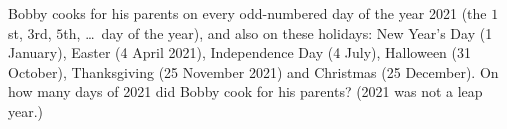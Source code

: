 Bobby cooks for his parents on every odd-numbered day of the year 2021 (the $1$st, $3$rd, $5$th, \dots\ day of the year), and also on these holidays: New Year's Day (1 January), Easter (4 April 2021), Independence Day (4 July), Halloween (31 October), Thanksgiving (25 November 2021) and Christmas (25 December). On how many days of 2021 did Bobby cook for his parents? (2021 was not a leap year.)

